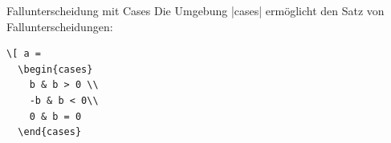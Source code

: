 \documentclass[
	vorläufig=true, 
	blattnr=2,
	ausgabe=2016-11-04,
	abgabe=2016-11-11,
	shortverb,
]{../tex/latexkurs-exercise}
\begin{document}

\begin{aufgabe}[3]{Fallunterscheidung mit Cases}
	Die Umgebung |cases| ermöglicht den Satz von Fallunterscheidungen:                                                                                                                                                                                                                                                     	\begin{lstlisting}                                                                                                                                                                                                                                                                                                             
\[ a =                                                                                                                                                                                                                                                                                                                         
  \begin{cases}                                                                                                                                                                                                                                                                                                                
    b & b > 0 \\                                                                                                                                                                                                                                                                                                         
    -b & b < 0\\                                                                                                                                                                                                                                                                                                               
    0 & b = 0                                                                                                                                                                                                                                                                                                                  
  \end{cases}                                                                                                                                                                                                                                                                                                                  

\end{lstlisting}
\end{aufgabe}
\end{document}
